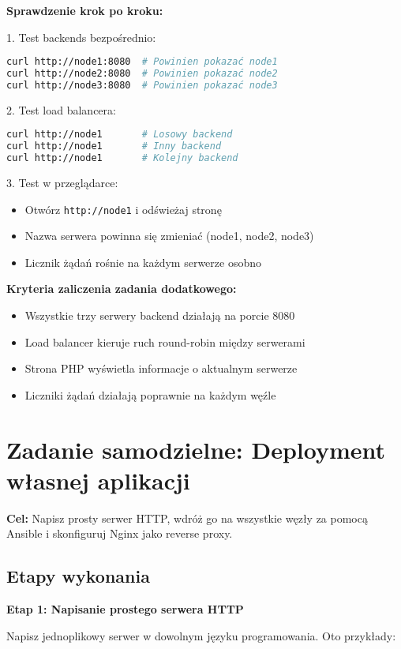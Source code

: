 \documentclass{article}
\begin{document}
\textbf{Sprawdzenie krok po kroku:}

1. Test backends bezpośrednio:
\begin{lstlisting}[language=bash]
curl http://node1:8080  # Powinien pokazać node1
curl http://node2:8080  # Powinien pokazać node2
curl http://node3:8080  # Powinien pokazać node3
\end{lstlisting}

2. Test load balancera:
\begin{lstlisting}[language=bash]
curl http://node1       # Losowy backend
curl http://node1       # Inny backend
curl http://node1       # Kolejny backend
\end{lstlisting}

3. Test w przeglądarce:
\begin{itemize}
    \item Otwórz \texttt{http://node1} i odświeżaj stronę
    \item Nazwa serwera powinna się zmieniać (node1, node2, node3)
    \item Licznik żądań rośnie na każdym serwerze osobno
\end{itemize}

\textbf{Kryteria zaliczenia zadania dodatkowego:}
\begin{itemize}
    \item Wszystkie trzy serwery backend działają na porcie 8080
    \item Load balancer kieruje ruch round-robin między serwerami
    \item Strona PHP wyświetla informacje o aktualnym serwerze
    \item Liczniki żądań działają poprawnie na każdym węźle
\end{itemize}

\section{Zadanie samodzielne: Deployment własnej aplikacji}

\textbf{Cel:} Napisz prosty serwer HTTP, wdróż go na wszystkie węzły za pomocą Ansible i skonfiguruj Nginx jako reverse proxy.

\subsection*{Etapy wykonania}

\textbf{Etap 1: Napisanie prostego serwera HTTP}

Napisz jednoplikowy serwer w dowolnym języku programowania. Oto przykłady:
\end{document}
